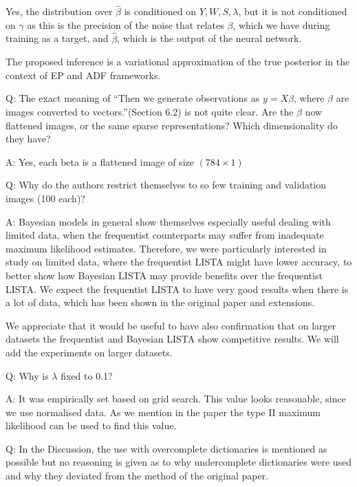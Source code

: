 \documentclass{article}
\begin{document}
Yes, the distribution over $\widehat{\beta}$ is conditioned on $Y, W, S, \lambda$, but it is not conditioned on $\gamma$ as this is the precision of the noise that relates $\beta$, which we have during training as a target, and $\widehat{\beta}$, which is the output of the neural network.

The proposed inference is a variational approximation of the true posterior in the context of EP and ADF frameworks.
\newline
\newline

Q: The exact meaning of “Then we generate observations as $y = X \beta$, where $\beta$ are images converted to vectors.”(Section 6.2) is not quite clear. Are the $\beta$ now flattened images, or the same sparse representations? Which dimensionality do they have?

A: Yes, each beta is a flattened image of size $(784 \times 1)$
\newline
\newline

Q: Why do the authors restrict themselves to so few training and validation images (100 each)?

A: Bayesian models in general show themselves especially useful dealing with limited data, when the frequentist counterparts may suffer from inadequate maximum likelihood estimates. Therefore, we were particularly interested in study on limited data, where the frequentist LISTA might have lower accuracy, to better show how Bayesian LISTA may provide benefits over the frequentist LISTA. We expect the frequentist LISTA to have very good results when there is a lot of data, which has been shown in the original paper and extensions.

We appreciate that it would be useful to have also confirmation that on larger datasets the frequentist and Bayesian LISTA show competitive results. We will add the experiments on larger datasets.
\newline
\newline

Q: Why is $\lambda$ fixed to 0.1?

A: It was empirically set based on grid search. This value looks reasonable, since we use normalised data. As we mention in the paper the type II maximum likelihood can be used to find this value.
\newline
\newline

Q: In the Discussion, the use with overcomplete dictionaries is mentioned as possible but no reasoning is given as to why undercomplete dictionaries were used and why they deviated from the method of the original paper.
\end{document}
